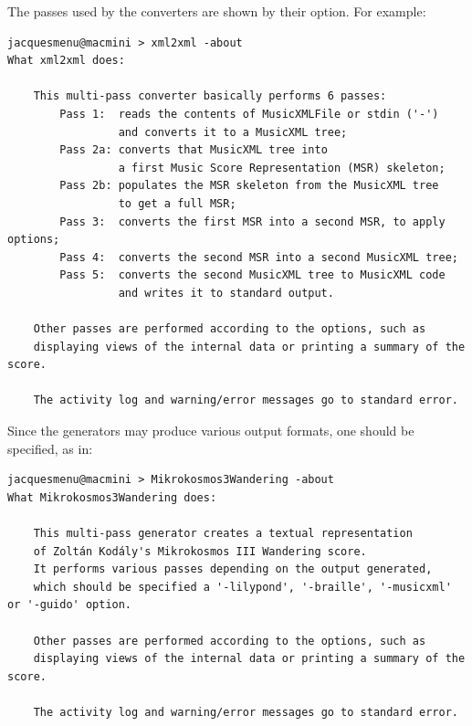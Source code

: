 The passes used by the converters are shown by their  option. For example:
\begin{lstlisting}[language=Terminal]
jacquesmenu@macmini > xml2xml -about
What xml2xml does:

    This multi-pass converter basically performs 6 passes:
        Pass 1:  reads the contents of MusicXMLFile or stdin ('-')
                 and converts it to a MusicXML tree;
        Pass 2a: converts that MusicXML tree into
                 a first Music Score Representation (MSR) skeleton;
        Pass 2b: populates the MSR skeleton from the MusicXML tree
                 to get a full MSR;
        Pass 3:  converts the first MSR into a second MSR, to apply options;
        Pass 4:  converts the second MSR into a second MusicXML tree;
        Pass 5:  converts the second MusicXML tree to MusicXML code
                 and writes it to standard output.

    Other passes are performed according to the options, such as
    displaying views of the internal data or printing a summary of the score.

    The activity log and warning/error messages go to standard error.
\end{lstlisting}

Since the generators may produce various output formats, one should be specified, as in:
\begin{lstlisting}[language=Terminal]
jacquesmenu@macmini > Mikrokosmos3Wandering -about
What Mikrokosmos3Wandering does:

    This multi-pass generator creates a textual representation
    of Zoltán Kodály's Mikrokosmos III Wandering score.
    It performs various passes depending on the output generated,
    which should be specified a '-lilypond', '-braille', '-musicxml' or '-guido' option.

    Other passes are performed according to the options, such as
    displaying views of the internal data or printing a summary of the score.

    The activity log and warning/error messages go to standard error.
\end{lstlisting}

